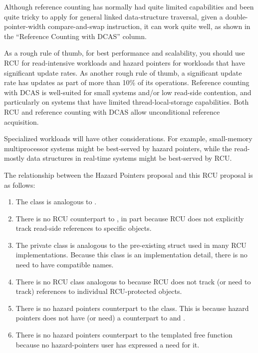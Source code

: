 \documentclass[letterpaper,10pt]{article}
\begin{document}
Although reference counting has normally had quite limited capabilities
and been quite tricky to apply for general linked data-structure
traversal, given a double-pointer-width compare-and-swap instruction,
it can work quite well, as shown in the ``Reference Counting with DCAS''
column.

As a rough rule of thumb, for best performance and scalability, you
should use RCU for read-intensive workloads and hazard pointers for
workloads that have significant update rates.
As another rough rule of thumb, a significant update rate has updates
as part of more than 10\% of its operations.
Reference counting with DCAS is well-suited for small systems and/or
low read-side contention, and particularly on systems that have limited
thread-local-storage capabilities.
Both RCU and reference counting with DCAS allow unconditional reference
acquisition.

Specialized workloads will have other considerations.
For example, small-memory multiprocessor systems might be best-served by
hazard pointers, while the read-mostly data structures in real-time
systems might be best-served by RCU.

The relationship between the Hazard Pointers proposal and this RCU
proposal is as follows:

\begin{enumerate}
\item	The  class is analogous to .
\item	There is no RCU counterpart to , in part because
	RCU does not explicitly track read-side references to specific
	objects.
\item	The private  class is analogous to the pre-existing
	 struct used in many RCU implementations.
	Because this class is an implementation detail, there is no
	need to have compatible names.
\item	There is no RCU class analogous to  because
	RCU does not track (or need to track) references to individual
	RCU-protected objects.
\item	There is no hazard pointers counterpart to the 
	class.
	This is because hazard pointers does not have (or need)
	a counterpart to  and .
\item	There is no hazard pointers counterpart to the 
	templated free function because no hazard-pointers user has
	expressed a need for it.
\end{enumerate}
\end{document}
